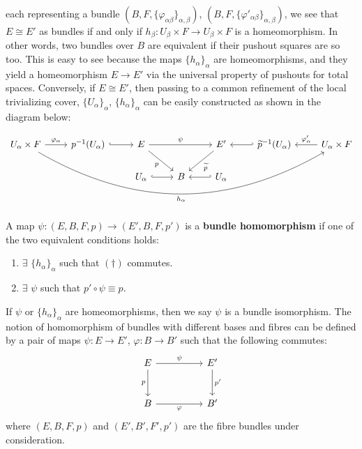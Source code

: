 \documentclass[11pt,a4paper]{article}
\begin{document}

each representing a bundle $(B, F, \{\varphi_{\alpha\beta}\}_{\alpha, \beta})$, $(B, F, \{\varphi'_{\alpha\beta}\}_{\alpha, \beta})$, we see that $E\cong E'$ as bundles if and only if $h_{\beta}: U_{\beta}\times F \rightarrow U_{\beta}\times F$ is a homeomorphism. In other words, two bundles over $B$ are equivalent if their pushout squares are so too. This is easy to see because the maps $\{h_{\alpha}\}_{\alpha}$ are homeomorphisms, and they yield a homeomorphism $E \rightarrow E'$ via the universal property of pushouts for total spaces. Conversely, if $E\cong E'$, then passing to a common refinement of the local trivializing cover, $\{U_{\alpha}\}_{\alpha}$, $\{h_{\alpha}\}_{\alpha}$ can be easily constructed as shown in the diagram below:

\[\begin{tikzcd}
	{U_{\alpha} \times F} & {p^{-1}(U_{\alpha})} & E && {E'} & {\widetilde{p}^{-1}(U_{\alpha})} & {U_{\alpha} \times F} \\
	&& {U_{\alpha}} & B & {U_{\alpha}}
	\arrow["{\varphi_{\alpha}}", from=1-1, to=1-2]
	\arrow[hook, from=1-2, to=1-3]
	\arrow["\psi", from=1-3, to=1-5]
	\arrow[hook', from=1-6, to=1-5]
	\arrow[hook, from=2-3, to=2-4]
	\arrow["{\varphi'_{\alpha}}"', from=1-7, to=1-6]
	\arrow[hook', from=2-5, to=2-4]
	\arrow["p"', from=1-3, to=2-4]
	\arrow["{\widetilde{p}}", from=1-5, to=2-4]
    \arrow["h_{\alpha}"', bend right, from=1-1, to=1-7]
\end{tikzcd}\]


\begin{definition}
A map $\psi: (E, B, F, p) \rightarrow (E', B, F, p')$ is a \textbf{bundle homomorphism} if one of the two equivalent conditions holds:
\begin{enumerate}
    \item $\exists$ $\{h_{\alpha}\}_{\alpha}$ such that $(\dagger)$ commutes.
    \item $\exists$ $\psi$ such that $p'\circ \psi \equiv p$.
\end{enumerate}
If $\psi$ or $\{h_{\alpha}\}_{\alpha}$ are homeomorphisms, then we say $\psi$ is a bundle isomorphism. The notion of homomorphism of bundles with different bases and fibres can be defined by a pair of maps $\psi: E \rightarrow E'$, $\varphi: B \rightarrow B'$ such that the following commutes:
$$\begin{tikzcd}[column sep=huge,row sep=large]
    E \arrow[r, "\psi"] \arrow[d, "p"'] &E' \arrow[d, "p'"]\\ B \arrow[r, "\varphi"'] & B'
\end{tikzcd}$$
where $(E, B, F, p)$ and $(E', B', F', p')$ are the fibre bundles under consideration.
\end{definition}
\end{document}
